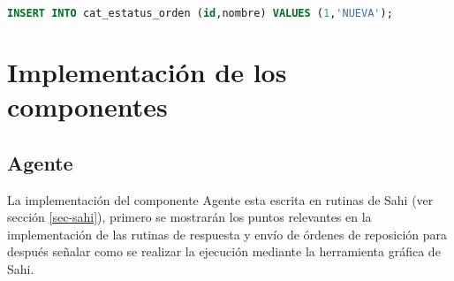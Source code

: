 \begin{lstlisting}[language=SQL, caption={Sentencia insertar un registro.}, label={lst:sql-insert}]
INSERT INTO cat_estatus_orden (id,nombre) VALUES (1,'NUEVA');
\end{lstlisting}

%

\section{Implementación de los componentes}

\subsection{Agente}
La implementación del componente Agente esta escrita en rutinas de Sahi (ver sección \ref{sec-sahi}), primero se mostrarán los puntos relevantes en la implementación de las rutinas de respuesta y envío de órdenes de reposición para después señalar como se realizar la ejecución mediante la herramienta gráfica de Sahi.

